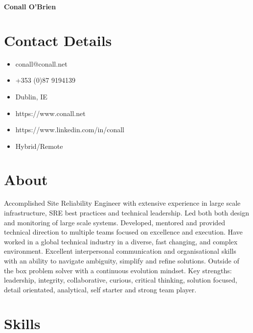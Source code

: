 \documentclass[a4paper, 10pt] {article}
\begin{document}
\begingroup
  \centering
  \LARGE \textbf{Conall O'Brien}\\[1.5em]
\endgroup

\hrulefill

\section*{Contact Details}

\begin{multicols}{2}

  \begin{itemize}
    \item conall@conall.net
    \item +353 (0)87 9194139
    \item Dublin, IE
    \item https://www.conall.net
    \item https://www.linkedin.com/in/conall
    \item Hybrid/Remote
  \end{itemize}

\end{multicols}

\hrulefill

\section*{About}

Accomplished Site Reliability Engineer with extensive experience in
large scale infrastructure, SRE best practices and technical leadership.
Led both both design and monitoring of large scale systems.
Developed, mentored and provided technical direction to multiple teams
focused on excellence and execution. Have worked in a global technical
industry in a diverse, fast changing, and complex environment. Excellent
interpersonal communication and organisational skills with an ability to
navigate ambiguity, simplify and refine solutions. Outside of the box
problem solver with a continuous evolution mindset. Key strengths:
leadership, integrity, collaborative, curious, critical thinking, solution
focused, detail orientated, analytical, self starter and strong team player.

\section*{Skills}
\end{document}
